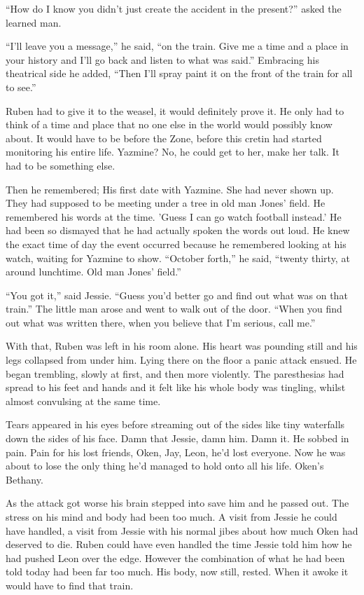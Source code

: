 ``How do I know you didn't just create the accident in the present?'' asked the learned man.

``I'll leave you a message,'' he said, ``on the train.  Give me a time and a place in your history and I'll go back and listen to what was said.''  Embracing his theatrical side he added, ``Then I'll spray paint it on the front of the train for all to see.''

Ruben had to give it to the weasel, it would definitely prove it.  He only had to think of a time and place that no one else in the world would possibly know about.  It would have to be before the Zone, before this cretin had started monitoring his entire life.  Yazmine?  No, he could get to her, make her talk.  It had to be something else.  

Then he remembered; His first date with Yazmine.  She had never shown up.  They had supposed to be meeting under a tree in old man Jones' field.  He remembered his words at the time.  'Guess I can go watch football instead.'  He had been so dismayed that he had actually spoken the words out loud.  He knew the exact time of day the event occurred because he remembered looking at his watch, waiting for Yazmine to show.  ``October forth,'' he said, ``twenty thirty, at around lunchtime.  Old man Jones' field.''

``You got it,'' said Jessie.  ``Guess you'd better go and find out what was on that train.''  The little man arose and went to walk out of the door.  ``When you find out what was written there, when you believe that I'm serious, call me.''

With that, Ruben was left in his room alone.  His heart was pounding still and his legs collapsed from under him.  Lying there on the floor a panic attack ensued.  He began trembling, slowly at first, and then more violently.  The paresthesias had spread to his feet and hands and it felt like his whole body was tingling, whilst almost convulsing at the same time.  

Tears appeared in his eyes before streaming out of the sides like tiny waterfalls down the sides of his face.  Damn that Jessie, damn him.  Damn it.  He sobbed in pain.  Pain for his lost friends, Oken, Jay, Leon, he'd lost everyone.  Now he was about to lose the only thing he'd managed to hold onto all his life.  Oken's Bethany.  

As the attack got worse his brain stepped into save him and he passed out.  The stress on his mind and body had been too much.  A visit from Jessie he could have handled, a visit from Jessie with his normal jibes about how much Oken had deserved to die.  Ruben could have even handled the time Jessie told him how he had pushed Leon over the edge.  However the combination of what he had been told today had been far too much.  His body, now still, rested.  When it awoke it would have to find that train.  



